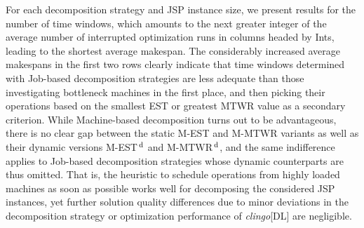 \documentclass{tlp} %
\newcommand{\clingodl}{\emph{clingo}[DL]\xspace}
\newcommand{\ksverify}[1]{#1}%
\begin{document}
For each decomposition strategy and JSP instance size, we present results for the number
of time windows,
which amounts to the next greater integer of the average number of interrupted optimization
runs in columns headed by Ints, leading to the shortest average makespan.
The considerably increased average makespans in the first two rows clearly indicate that
time windows determined with Job-based decomposition strategies are less adequate than
those investigating bottleneck machines in the first place, and then picking their operations
based on the smallest EST or greatest MTWR value as a secondary criterion.
While Machine-based decomposition turns out to be advantageous,
there is no clear gap between the static M-EST and M-MTWR variants as well as their dynamic
versions M-EST$^\text{\,d}$ and M-MTWR$^\text{\,d}$\ksverify{,
and the same indifference applies to Job-based decomposition strategies whose dynamic counterparts are thus omitted}.
That is, the heuristic to schedule operations from highly loaded machines
as soon as possible works well for decomposing the considered JSP instances,
yet further solution quality differences due to minor deviations in the
decomposition strategy or optimization performance of \clingodl are negligible.
\end{document}
